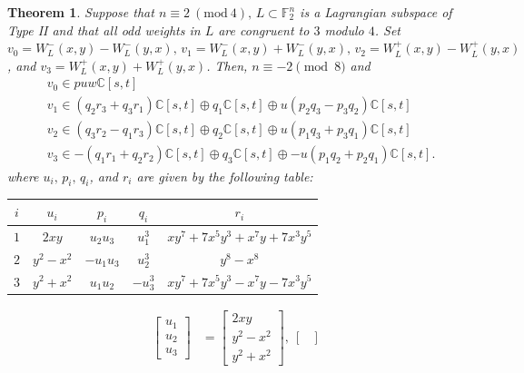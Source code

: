 \documentclass[a4paper,reqno]{amsart}
\newtheorem{theorem}{Theorem}[section]
\theoremstyle{definition}
\theoremstyle{remark} \newtheorem{remark}[theorem]{Remark}
\numberwithin{equation}{section}
\begin{document}
\begin{theorem}\label{W_L:n=-2(8)} 
    Suppose that \(n \equiv 2 \ (\textrm{mod}\ 4),\, L\subset \mathbb{F}_2^n\) is a Lagrangian subspace of Type II and that all odd weights in \(L\) are congruent to \(3\) modulo \(4\). Set \(v_0 = W_L^-(x,y) - W_L^-(y,x),\, v_1 = W_L^-(x,y) + W_L^-(y,x),\, v_2 = W_L^+(x,y) - W_L^+(y,x)\), and \(v_3 = W_L^+(x,y) + W_L^+(y,x)\). Then, \(n \equiv -2 \pmod{8}\) and 
    \begin{align*}
        &v_0 \in puw\mathbb{C}[s,t] \\
        &v_1 \in (q_2r_3 + q_3r_1)\mathbb{C}[s,t] \oplus q_1\mathbb{C}[s,t] \oplus u(p_2q_3-p_3q_2)\mathbb{C}[s,t] \\
        &v_2 \in (q_3r_2-q_1r_3)\mathbb{C}[s,t] \oplus q_2\mathbb{C}[s,t] \oplus u(p_1q_3+p_3q_1)\mathbb{C}[s,t] \\
        &v_3 \in -(q_1r_1+q_2r_2)\mathbb{C}[s,t] \oplus q_3\mathbb{C}[s,t] \oplus -u(p_1q_2+p_2q_1)\mathbb{C}[s,t].
    \end{align*}
    where \(u_i,\, p_i,\, q_i\), and \(r_i\) are given by the following table:
    \begin{center}
        \begin{tabular}{|c|c|c|c|c|}
             \hline
             \(i\) & \(u_i\) & \(p_i\) & \(q_i\) & \(r_i\) \\ \hline
             \(1\) &  \(2xy\) & \(u_2u_3\) & \(u_1^3\) & \(xy^7 + 7x^5y^3 + x^7y + 7x^3y^5\) \\
             \(2\) &  \(y^2 - x^2\) & \(-u_1u_3\) & \(u_2^3\) & \(y^8 - x^8\) \\
             \(3\) &  \(y^2 + x^2\) & \(u_1u_2\) & \(-u_3^3\) & \(xy^7 + 7x^5y^3 - x^7y - 7x^3y^5\) \\
             \hline
        \end{tabular}
    \end{center}
    \iffalse
    \begin{align*}
        \begin{bmatrix}
            u_1 \\
            u_2 \\
            u_3
        \end{bmatrix}
        &=
        \begin{bmatrix}
             2xy \\
            y^2 - x^2 \\
            y^2 + x^2
        \end{bmatrix}, \:
        \begin{bmatrix}

\end{bmatrix}
\end{align*}
\end{theorem}
\end{document}
